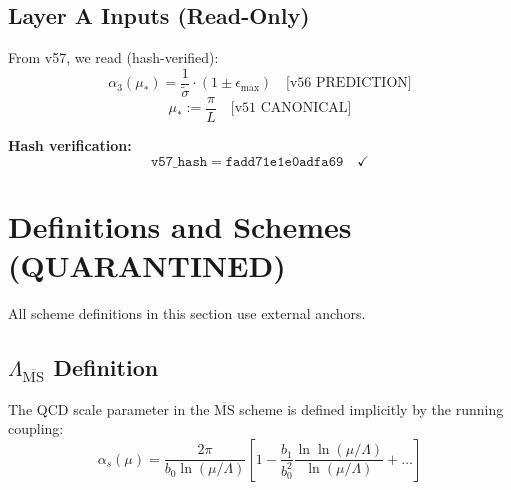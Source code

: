 \documentclass[11pt,a4paper]{article}
\theoremstyle{definition}
\begin{document}
\subsection{Layer A Inputs (Read-Only)}
\label{subsec:layer-a-inputs}

From v57, we read (hash-verified):
\begin{equation}
\label{eq:layer-a-input-1}
\alpha_3(\mu_*) = \frac{1}{\tilde{\sigma}} \cdot (1 \pm \epsilon_{\max})
  \quad \text{[v56 PREDICTION]}
\end{equation}
\begin{equation}
\label{eq:layer-a-input-2}
\mu_* := \frac{\pi}{L} \quad \text{[v51 CANONICAL]}
\end{equation}

\textbf{Hash verification:}
\begin{equation}
\label{eq:v57-hash-verify}
\texttt{v57\_hash} = \texttt{fadd71e1e0adfa69} \quad \checkmark
\end{equation}

\begin{quarantinebox}
\end{quarantinebox}

\section{Definitions and Schemes (QUARANTINED)}
\label{sec:definitions}

\begin{quarantinebox}
All scheme definitions in this section use external anchors.
\end{quarantinebox}

\subsection{$\Lambda_{\overline{\text{MS}}}$ Definition}
\label{subsec:lambda-def}

The QCD scale parameter in the $\overline{\text{MS}}$ scheme is defined
implicitly by the running coupling:
\begin{equation}
\label{eq:lambda-def-implicit}
\alpha_s(\mu) = \frac{2\pi}{b_0 \ln(\mu/\Lambda)}
  \left[1 - \frac{b_1}{b_0^2}\frac{\ln\ln(\mu/\Lambda)}{\ln(\mu/\Lambda)} + \ldots\right]
\end{equation}
\end{document}
